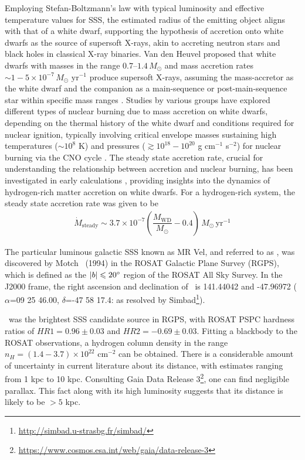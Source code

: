     	Employing Stefan-Boltzmann's law with typical luminosity and effective temperature values for SSS, the estimated radius of the emitting object aligns with that of a white dwarf, supporting the hypothesis of accretion onto white dwarfs as the source of supersoft X-rays, akin to accreting neutron stars and black holes in classical X-ray binaries. Van den Heuvel proposed that white dwarfs with masses in the range $0.7–1.4\,M_\odot$ and mass accretion rates $\sim 1-5\times 10^{-7}\,M_\odot\text{ yr}^{-1}$ produce supersoft X-rays, assuming the mass-accretor as the white dwarf and the companion as a main-sequence or post-main-sequence star within specific mass ranges \cite{van1992accreting}. Studies by various groups have explored different types of nuclear burning due to mass accretion on white dwarfs, depending on the thermal history of the white dwarf and conditions required for nuclear ignition, typically involving critical envelope masses %
    sustaining high temperatures ($\sim 10^8$ K) and pressures ($\gtrsim 10^{18}-10^{20}$ g cm$^{-1}$ s$^{-2}$) for nuclear burning via the CNO cycle \cite{paczynski78,prialnik78,sion79,sienkiewicz80,nomoto82,fujimoto82a,fujimoto82b,iben82,prialnik95,macdonald83}. The steady state accretion rate, crucial for understanding the relationship between accretion and nuclear burning, has been investigated in early calculations \cite{paczynski80,iben82}, providing insights into the dynamics of hydrogen-rich matter accretion on white dwarfs. For a hydrogen-rich system, the steady state accretion rate was given to be \cite{hachisu2001}
		\begin{align}
			\dot{M}_\text{steady}\sim 3.7\times 10^{-7}\left( \dfrac{M_\text{WD}}{M_\odot}-0.4 \right)\,M_\odot\,\text{yr}^{-1} \label{eqn:steady-mass-accr}
		\end{align}
	
		The particular luminous galactic SSS known as MR Vel, and referred to as \source, was discovered by Motch \etal\ (1994) \cite{motch1994} in the ROSAT Galactic Plane Survey (RGPS), which  is defined as the $|b|\leqslant 20\degree$ region of the ROSAT All Sky Survey. In the J2000 frame, the right ascension and declination of \source\ is 141.44042 and -47.96972 ($\alpha$=09 25 46.00, $\delta$=-47 58 17.4: as resolved by Simbad\footnote{\url{http://simbad.u-strasbg.fr/simbad/}}).
		
		\source\ was the brightest SSS candidate source in RGPS, with ROSAT PSPC hardness ratios of $HR1=0.96\pm 0.03$ and $HR2=-0.69\pm 0.03$. Fitting a blackbody to the ROSAT observations, a hydrogen column density in the range $n_H=(1.4-3.7)\times 10^{22}$ cm$^{-2}$ can be obtained. There is a considerable amount of uncertainty in current literature about its distance, with estimates ranging from 1 kpc to 10 kpc. Consulting Gaia Data Release 3\footnote{\url{https://www.cosmos.esa.int/web/gaia/data-release-3}}, one can find negligible parallax. This fact along with its high luminosity suggests that its distance is likely to be $>5$ kpc.
		
